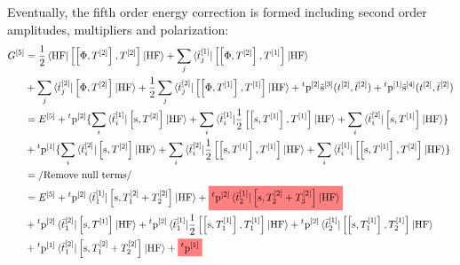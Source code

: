 Eventually, the fifth order energy correction is formed including second order
amplitudes, multipliers and polarization:
\begin{equation}\label{eq:fifth-order-G}
  \begin{aligned}
    G^{[5]} &=
    \frac{1}{2}\braket{\mathrm{HF} |
    \commutator{\commutator{\Phi}{T^{[2]}}}{T^{[2]}}
    | \mathrm{HF}}
    +
    \sum_j \braket{\tbar{j}^{[1]} |
    \commutator{\commutator{\Phi}{T^{[2]}}}{T^{[1]}}
    | \mathrm{HF}} \\
    &+ \sum_j \braket{\tbar{j}^{[2]} |
      \commutator{\Phi}{T^{[2]}}
    | \mathrm{HF}}
    +
    \frac{1}{2}\sum_j\braket{\tbar{j}^{[2]} |
    \commutator{\commutator{\Phi}{T^{[1]}}}{T^{[1]}}
    | \mathrm{HF}}
    + {}^t\p^{[2]}\tilde{\s}^{[3]}(\tamp{}^{[2]}, \tbar{}^{[2]})
    + {}^t\p^{[1]}\tilde{\s}^{[4]}(\tamp{}^{[2]}, \tbar{}^{[2]}) \\
    &= E^{[5]}
    + {}^t\p^{[2]}
    \lbrace
    \sum_i\braket{\tbar{i}^{[1]} | \commutator{\s}{T^{[2]}} | \mathrm{HF}}
    +
    \sum_i\braket{\tbar{i}^{[1]} |
    \frac{1}{2}\commutator{\commutator{\s}{T^{[1]}}}{T^{[1]}}
    | \mathrm{HF}}
    +
    \sum_i\braket{\tbar{i}^{[2]} | \commutator{\s}{T^{[1]}} | \mathrm{HF}}
    \rbrace \\
    &+ {}^t\p^{[1]}
    \lbrace
    \sum_i\braket{\tbar{i}^{[2]} | \commutator{\s}{T^{[2]}} | \mathrm{HF}}
    +
    \sum_i\braket{\tbar{i}^{[2]} |
    \frac{1}{2}\commutator{\commutator{\s}{T^{[1]}}}{T^{[1]}}
    | \mathrm{HF}}
    +
    \sum_i\braket{\tbar{i}^{[1]} |
    \commutator{\commutator{\s}{T^{[1]}}}{T^{[2]}}
    | \mathrm{HF}}
    \rbrace \\
  &= \left/ \text{Remove null terms} \right/ \\
    &= E^{[5]}
    + {}^t\p^{[2]}\braket{\tbar{1}^{[1]} | \commutator{\s}{T_1^{[2]} + T_2^{[2]}} | \mathrm{HF}}
    + \highlight{
    {}^t\p^{[2]}\braket{\tbar{2}^{[1]} | \commutator{\s}{T_2^{[2]} + T_3^{[2]}} | \mathrm{HF}}
    } \\
    &+ {}^t\p^{[2]}\braket{\tbar{1}^{[2]} | \commutator{\s}{T^{[1]}} | \mathrm{HF}}
    + {}^t\p^{[2]}
    \braket{\tbar{1}^{[1]} |
    \frac{1}{2}\commutator{\commutator{\s}{T_1^{[1]}}}{T_1^{[1]}}
    | \mathrm{HF}}
    + {}^t\p^{[2]}
    \braket{\tbar{2}^{[1]} |
    \commutator{\commutator{\s}{T_1^{[1]}}}{T_2^{[1]}}
    | \mathrm{HF}}
    \\
    &+
    {}^t\p^{[1]}
    \braket{\tbar{1}^{[2]} | \commutator{\s}{T_1^{[2]} + T_2^{[2]}} | \mathrm{HF}}
    +
    \highlight{
    {}^t\p^{[1]}
}
\end{aligned}
\end{equation}
